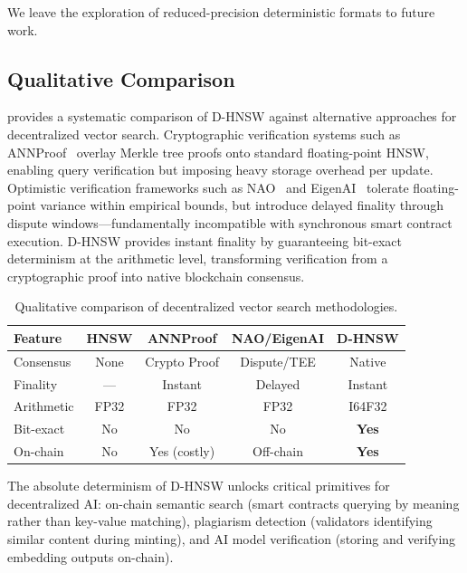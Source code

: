 \documentclass[10pt,journal,compsoc]{IEEEtran}
\newcommand{\dhnsw}{\textsc{D-HNSW}}
\newcommand{\hnsw}{\textsc{HNSW}}
\begin{document}
We leave the exploration of reduced-precision deterministic formats to future work.

\subsection{Qualitative Comparison}

 provides a systematic comparison of \dhnsw{} against alternative approaches for decentralized vector search. Cryptographic verification systems such as ANNProof~\cite{lu2024annproof} overlay Merkle tree proofs onto standard floating-point \hnsw{}, enabling query verification but imposing heavy storage overhead per update. Optimistic verification frameworks such as NAO~\cite{yao2025nao} and EigenAI~\cite{alves2026eigenai} tolerate floating-point variance within empirical bounds, but introduce delayed finality through dispute windows---fundamentally incompatible with synchronous smart contract execution. \dhnsw{} provides instant finality by guaranteeing bit-exact determinism at the arithmetic level, transforming verification from a cryptographic proof into native blockchain consensus.

\begin{table}[t]
  \centering
  \caption{Qualitative comparison of decentralized vector search methodologies.}
  \label{tab:qualitative}
  \footnotesize
  \begin{tabular}{lcccc}
    \toprule
    \textbf{Feature} & \textbf{HNSW} & \textbf{ANNProof} & \textbf{NAO/EigenAI} & \textbf{\dhnsw{}} \\
    \midrule
    Consensus     & None  & Crypto Proof & Dispute/TEE & Native \\
    Finality      & ---   & Instant      & Delayed     & Instant \\
    Arithmetic    & FP32  & FP32         & FP32        & I64F32 \\
    Bit-exact     & No    & No           & No          & \textbf{Yes} \\
    On-chain      & No    & Yes (costly) & Off-chain   & \textbf{Yes} \\
    \bottomrule
  \end{tabular}
\end{table}

The absolute determinism of \dhnsw{} unlocks critical primitives for decentralized AI: on-chain semantic search (smart contracts querying by meaning rather than key-value matching), plagiarism detection (validators identifying similar content during minting), and AI model verification (storing and verifying embedding outputs on-chain).
\end{document}
